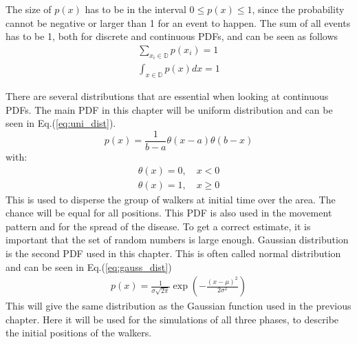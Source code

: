 \documentclass[%
twoside,                 %
final,                   %
chapterprefix=true,      %
open=right               %
10pt]{book}
\begin{document}
The size of $p(x)$ has to be in the interval $0\leq p(x) \leq 1$, since the probability cannot be negative or larger than 1 for an event to happen. The sum of all events has to be 1, both for discrete and continuous PDFs, and can be seen as follows
\begin{equation}
	\begin{aligned}
    \sum_{x_i \in \mathbb{D}} p(x_i) = 1\\
    \int_{x \in \mathbb{D}} p(x) dx = 1
	\end{aligned}
\end{equation} 

There are several distributions that are essential when looking at continuous PDFs. The main PDF in this chapter will be uniform distribution and can be seen in Eq.(\ref{eq:uni_dist}).
\begin{equation} \label{eq:uni_dist}
p(x) = \frac{1}{b-a}\theta(x-a)\theta(b-x)
\end{equation}
with:
\begin{equation}
	\begin{aligned}
    \theta(x) = 0,\quad x < 0 \\
    \theta(x) = 1,\quad x \geq 0
	\end{aligned}
\end{equation}
This is used to disperse the group of walkers at initial time over the area. The chance will be equal for all positions. This PDF is also used in the movement pattern and for the spread of the disease. To get a correct estimate, it is important that the set of random numbers is large enough. Gaussian distribution is the second PDF used in this chapter. This is often called normal distribution and can be seen in Eq.(\ref{eq:gauss_dist})
\begin{equation} \label{eq:gauss_dist}
	\begin{aligned}
    p(x) = \frac{1}{\sigma \sqrt{2\pi}} \exp(-\frac{(x-\mu)^2}{2\sigma^2})
	\end{aligned}
\end{equation}
This will give the same distribution as the Gaussian function used in the previous chapter. Here it will be used for the simulations of all three phases, to describe the initial positions of the walkers. 
\end{document}
